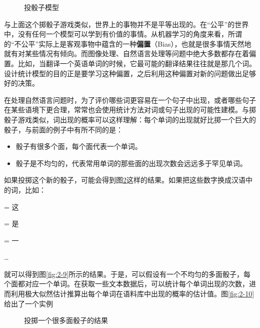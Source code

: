 \begin{figure}[htp]
\centering

\caption{投骰子模型}
\label{fig:2-7}
\end{figure}

\parinterval 与上面这个掷骰子游戏类似，世界上的事物并不是平等出现的。在“公平”的世界中，没有任何一个模型可以学到有价值的事情。从机器学习的角度来看，所谓的“不公平”实际上是客观事物中蕴含的一种{\small\sffamily\bfseries{偏置}}（Bias），也就是很多事情天然地就有对某些情况有倾向。而图像处理、自然语言处理等问题中绝大多数都存在着偏置。比如，当翻译一个英语单词的时候，它最可能的翻译结果往往就是那几个词。设计统计模型的目的正是要学习这种偏置，之后利用这种偏置对新的问题做出足够好的决策。

\parinterval 在处理自然语言问题时，为了评价哪些词更容易在一个句子中出现，或者哪些句子在某些语境下更合理，常常也会使用统计方法对词或句子出现的可能性建模。与掷骰子游戏类似，词出现的概率可以这样理解：每个单词的出现就好比掷一个巨大的骰子，与前面的例子中有所不同的是：

\begin{itemize}
\vspace{0.5em}
\item 骰子有很多个面，每个面代表一个单词。
\vspace{0.5em}
\item 骰子是不均匀的，代表常用单词的那些面的出现次数会远远多于罕见单词。
\vspace{0.5em}
\end{itemize}

\parinterval 如果投掷这个新的骰子，可能会得到图\ref{fig:2-8}这样的结果。如果把这些数字换成汉语中的词，比如：
\vspace{0.5em}

\; = \; 这

\; = \; 是

\; = \; 一

\parinterval  \ldots
\vspace{0.5em}

\parinterval 就可以得到图\ref{fig:2-9}所示的结果。于是，可以假设有一个不均匀的多面骰子，每个面都对应一个单词。在获取一些文本数据后，可以统计每个单词出现的次数，进而利用极大似然估计推算出每个单词在语料库中出现的概率的估计值。图\ref{fig:2-10}给出了一个实例

\begin{figure}[htp]
\centering

\caption{投掷一个很多面骰子的结果}
\label{fig:2-8}
\end{figure}

